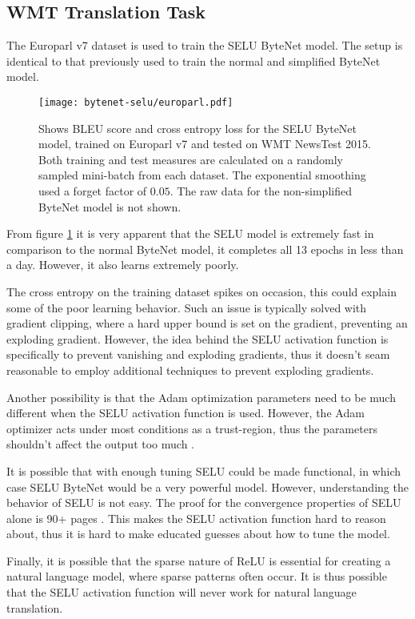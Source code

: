 \clearpage
\subsection{WMT Translation Task}

The Europarl v7 dataset is used to train the SELU ByteNet model. The setup is identical to that previously used to train the normal and simplified ByteNet model.

\begin{figure}[h]
    \centering
    \texttt{[image: bytenet-selu/europarl.pdf]}
    \caption{Shows BLEU score and cross entropy loss for the SELU ByteNet model, trained on Europarl v7 and tested on WMT NewsTest 2015. Both training and test measures are calculated on a randomly sampled mini-batch from each dataset. The exponential smoothing used a forget factor of $0.05$. The raw data for the non-simplified ByteNet model is not shown.}
    \label{fig:result:bytenet-selu:europarl}
\end{figure}

From figure \ref{fig:result:bytenet-selu:europarl} it is very apparent that the SELU model is extremely fast in comparison to the normal ByteNet model, it completes all 13 epochs in less than a day. However, it also learns extremely poorly.

The cross entropy on the training dataset spikes on occasion, this could explain some of the poor learning behavior. Such an issue is typically solved with gradient clipping, where a hard upper bound is set on the gradient, preventing an exploding gradient. However, the idea behind the SELU activation function is specifically to prevent vanishing and exploding gradients, thus it doesn't seam reasonable to employ additional techniques to prevent exploding gradients.

Another possibility is that the Adam optimization parameters need to be much different when the SELU activation function is used. However, the Adam optimizer acts under most conditions as a trust-region, thus the parameters shouldn't affect the output too much \cite{adam-optimization}.

It is possible that with enough tuning SELU could be made functional, in which case SELU ByteNet would be a very powerful model. However, understanding the behavior of SELU is not easy. The proof for the convergence properties of SELU alone is 90+ pages \cite{selu}. This makes the SELU activation function hard to reason about, thus it is hard to make educated guesses about how to tune the model.

Finally, it is possible that the sparse nature of ReLU is essential for creating a natural language model, where sparse patterns often occur. It is thus possible that the SELU activation function will never work for natural language translation.